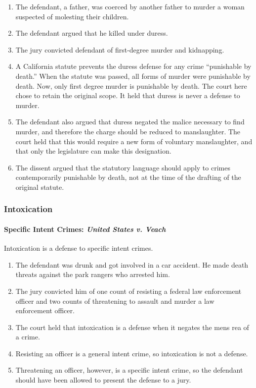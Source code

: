\begin{enumerate}
    \item The defendant, a father, was coerced by another father to murder a 
    woman suspected of molesting their children.
    \item The defendant argued that he killed under duress.
    \item The jury convicted defendant of first-degree murder and kidnapping.
    \item A California statute prevents the duress defense for any crime 
    ``punishable by death.'' When the statute was passed, all forms of murder 
    were punishable by death. Now, only first degree murder is punishable by 
    death. The court here chose to retain the original scope. It held that 
    duress is never a defense to murder.
    \item The defendant also argued that duress negated the malice necessary 
    to find murder, and therefore the charge should be reduced to 
    manslaughter. The court held that this would require a new form of 
    voluntary manslaughter, and that only the legislature can make this 
    designation.
    \item The dissent argued that the statutory language should apply to 
    crimes contemporarily punishable by death, not at the time of the drafting 
    of the original statute.
\end{enumerate}

\subsubsection{Intoxication}

\paragraph{Specific Intent Crimes: \emph{United States v. Veach}}

Intoxication is a defense to specific intent crimes.

\begin{enumerate}
    \item The defendant was drunk and got involved in a car accident. He made 
    death threats against the park rangers who arrested him.
    \item The jury convicted him of one count of resisting a federal law 
    enforcement officer and two counts of threatening to assault and murder a 
    law enforcement officer.
    \item The court held that intoxication is a defense when it negates the 
    mens rea of a crime.
    \item Resisting an officer is a general intent crime, so intoxication is 
    not a defense.
    \item Threatening an officer, however, is a specific intent crime, so the 
    defendant should have been allowed to present the defense to a jury.
\end{enumerate}

